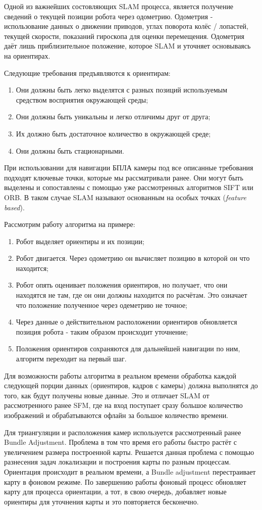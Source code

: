 Одной из важнейших состовляющих SLAM процесса, является получение сведений о текущей позиции робота через одометрию. Одометрия - использование данных о движении приводов, углах поворота колёс / лопастей, текущей скорости, показаний гироскопа для оценки перемещения. Одометрия даёт лишь приблизительное положение, которое SLAM и уточняет основываясь на ориентирах.

Следующие требования предъявляются к ориентирам:
\begin{enumerate}
    \item Они должны быть легко выделятся с разных позиций используемым средством восприятия окружающей среды;
    \item Они должны быть уникальны и легко отличимы друг от друга;
    \item Их должно быть достаточное количество в окружающей среде;
    \item Они должны быть стационарными.
\end{enumerate}

При использовании для навигации БПЛА камеры под все описанные требования подходят ключевые точки, которые мы рассматривали ранее. Они могут быть выделены и сопоставлены с помощью уже рассмотренных алгоритмов SIFT или ORB. В таком случае SLAM называют основанным на особых точках (\textit{feature based}).

Рассмотрим работу алгоритма на примере:
\begin{enumerate}
    \item Робот выделяет ориентиры и их позиции;
    \item Робот двигается. Через одометрию он вычисляет позицию в которой он  что находится;
    \item Робот опять оценивает положения ориентиров, но получает, что они находятся не там, где он  они должны находится по расчётам. Это означает что положение полученное через одеметрию не точное;
    \item Через данные о действительном расположении ориентиров обновляется позиция робота - таким образом происходит уточнение;
    \item Положения ориентиров сохраняются для дальнейшей навигации по ним, алгоритм переходит на первый шаг.
\end{enumerate}

Для возможности работы алгоритма в реальном времени обработка каждой следующей порции данных (ориентиров, кадров с камеры) должна выполнятся до того, как будут получены новые данные. Это и отличает SLAM от рассмотренного ранее SFM, где на вход поступает сразу большое количество изображений и обрабатываются офлайн за большое количество времени.

Для триангуляции и расположения камер используется рассмотренный ранее Bundle Adjustment. Проблема в том что время его работы быстро растёт с увеличением размера построенной карты. Решается данная проблема с помощью разнесения задач локализации и построения карты по разным процессам. Ориентация происходит в реальном времени, а Bundle adjustment перестраивает карту в фоновом режиме. По завершению работы фоновый процесс обновляет карту для процесса ориентации, а тот, в свою очередь, добавляет новые ориентиры для уточнения карты и это повторяется бесконечно.
